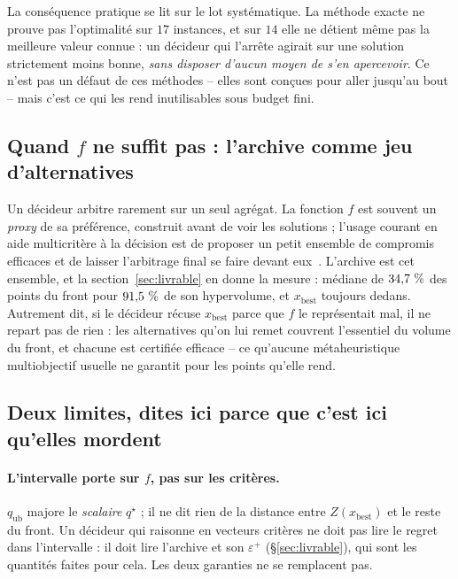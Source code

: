 \documentclass[11pt,a4paper]{article}
\theoremstyle{plain}
\theoremstyle{remark}
\newcommand{\qs}{q^{\star}}
\begin{document}
La conséquence pratique se lit sur le lot systématique. La méthode exacte ne
prouve pas l'optimalité sur $17$ instances, et sur $14$ elle
ne détient même pas la meilleure valeur connue : un décideur qui l'arrête
agirait sur une solution strictement moins bonne, \emph{sans disposer d'aucun
moyen de s'en apercevoir}. Ce n'est pas un défaut de ces méthodes -- elles
sont conçues pour aller jusqu'au bout -- mais c'est ce qui les rend
inutilisables sous budget fini.

\subsection{Quand $f$ ne suffit pas : l'archive comme jeu d'alternatives}

Un décideur arbitre rarement sur un seul agrégat. La fonction $f$ est
souvent un \emph{proxy} de sa préférence, construit avant de voir les
solutions ; l'usage courant en aide multicritère à la décision est de
proposer un petit ensemble de compromis efficaces et de laisser l'arbitrage
final se faire devant eux~\cite{roy1985}. L'archive est cet ensemble, et la
section~\ref{sec:livrable} en donne la mesure : médiane de $34{,}7{}\ \%$ des
points du front pour $91{,}5{}\ \%$ de son hypervolume, et $x_{\text{best}}$
toujours dedans. Autrement dit, si le décideur récuse $x_{\text{best}}$ parce
que $f$ le représentait mal, il ne repart pas de rien : les alternatives
qu'on lui remet couvrent l'essentiel du volume du front, et chacune est
certifiée efficace -- ce qu'aucune métaheuristique multiobjectif usuelle ne
garantit pour les points qu'elle rend.

\subsection{Deux limites, dites ici parce que c'est ici qu'elles mordent}

\paragraph{L'intervalle porte sur $f$, pas sur les critères.} $q_{\text{ub}}$
majore le \emph{scalaire} $\qs$ ; il ne dit rien de la distance entre
$Z(x_{\text{best}})$ et le reste du front. Un décideur qui raisonne en
vecteurs critères ne doit pas lire le regret dans l'intervalle : il doit lire
l'archive et son $\varepsilon^+$ (\S\ref{sec:livrable}), qui sont les
quantités faites pour cela. Les deux garanties ne se remplacent pas.
\end{document}
